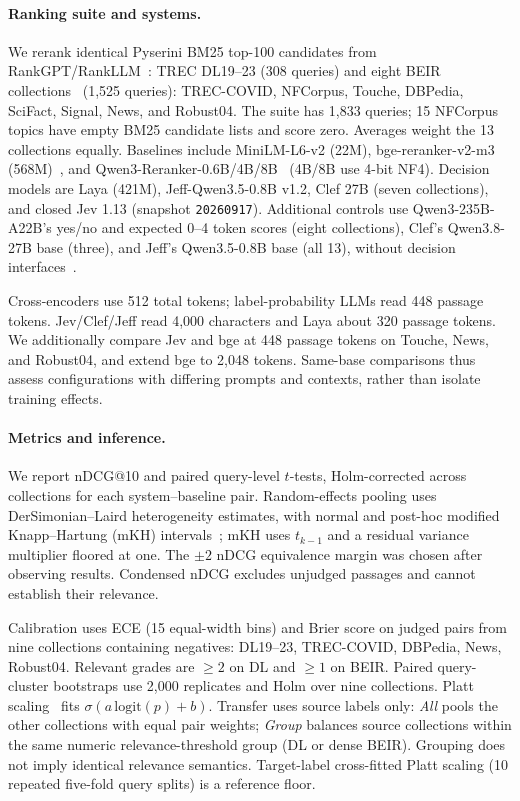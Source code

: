 \documentclass[sigconf,nonacm]{acmart}
\begin{document}
\paragraph{Ranking suite and systems.}
We rerank identical Pyserini BM25 top-100 candidates from RankGPT/RankLLM~\cite{sun2023rankgpt,rankllm}: TREC DL19--23 (308 queries) and eight BEIR collections~\cite{thakur2021beir} (1,525 queries): TREC-COVID, NFCorpus, Touche, DBPedia, SciFact, Signal, News, and Robust04. The suite has 1,833 queries; 15 NFCorpus topics have empty BM25 candidate lists and score zero. Averages weight the 13 collections equally. Baselines include MiniLM-L6-v2 (22M), bge-reranker-v2-m3 (568M)~\cite{bgererankerv2m3}, and Qwen3-Reranker-0.6B/4B/8B~\cite{qwen3embedding} (4B/8B use 4-bit NF4). Decision models are Laya (421M), Jeff-Qwen3.5-0.8B v1.2, Clef 27B (seven collections), and closed Jev 1.13 (snapshot \texttt{20260917}). Additional controls use Qwen3-235B-A22B's yes/no and expected 0--4 token scores (eight collections), Clef's Qwen3.8-27B base (three), and Jeff's Qwen3.5-0.8B base (all 13), without decision interfaces~\cite{zhuang2023beyond}.

Cross-encoders use 512 total tokens; label-probability LLMs read 448 passage tokens. Jev/Clef/Jeff read 4,000 characters and Laya about 320 passage tokens. We additionally compare Jev and bge at 448 passage tokens on Touche, News, and Robust04, and extend bge to 2,048 tokens. Same-base comparisons thus assess configurations with differing prompts and contexts, rather than isolate training effects.

\paragraph{Metrics and inference.}
We report nDCG@10 and paired query-level $t$-tests, Holm-corrected across collections for each system--baseline pair. Random-effects pooling uses DerSimonian--Laird heterogeneity estimates, with normal and post-hoc modified Knapp--Hartung (mKH) intervals~\cite{rover2015mkh}; mKH uses $t_{k-1}$ and a residual variance multiplier floored at one. The $\pm2$ nDCG equivalence margin was chosen after observing results. Condensed nDCG excludes unjudged passages and cannot establish their relevance.

Calibration uses ECE (15 equal-width bins) and Brier score on judged pairs from nine collections containing negatives: DL19--23, TREC-COVID, DBPedia, News, Robust04. Relevant grades are $\ge2$ on DL and $\ge1$ on BEIR. Paired query-cluster bootstraps use 2,000 replicates and Holm over nine collections. Platt scaling~\cite{platt1999} fits $\sigma(a\,\mathrm{logit}(p)+b)$. Transfer uses source labels only: \emph{All} pools the other collections with equal pair weights; \emph{Group} balances source collections within the same numeric relevance-threshold group (DL or dense BEIR). Grouping does not imply identical relevance semantics. Target-label cross-fitted Platt scaling (10 repeated five-fold query splits) is a reference floor.
\end{document}
